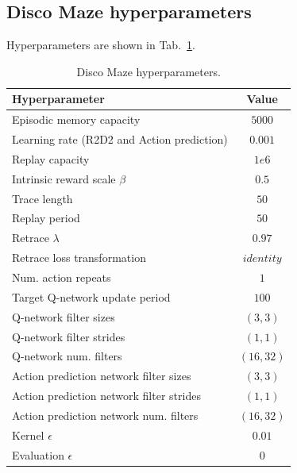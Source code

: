 \documentclass{article} %
\begin{document}
\subsection{Disco Maze hyperparameters}
Hyperparameters are shown in Tab.~\ref{table_hyper_discomaze}.
\begin{table}[h!]
\centering
\begin{tabular}{l|c}
\textbf{Hyperparameter} & \textbf{Value} \\ \hline
Episodic memory capacity & $5000$ \\ \hline
Learning rate (R2D2 and Action prediction) & $0.001$  \\ \hline
Replay capacity & $1e6$ \\ \hline 
Intrinsic reward scale $\beta$ & $0.5$ \\ \hline 
Trace length & $50$ \\ \hline
Replay period & $50$ \\ \hline
Retrace $\lambda$ & $0.97$ \\ \hline
Retrace loss transformation & $identity$ \\ \hline
Num. action repeats & $1$ \\ \hline
Target Q-network update period & $100$ \\ \hline
Q-network filter sizes & $(3, 3)$ \\ \hline
Q-network filter strides & $(1, 1)$ \\ \hline
Q-network num. filters & $(16, 32)$ \\ \hline
Action prediction network filter sizes & $(3, 3)$ \\ \hline
Action prediction network filter strides & $(1, 1)$ \\ \hline
Action prediction network num. filters & $(16, 32)$ \\ \hline
Kernel $\epsilon$ & $0.01$ \\ \hline
Evaluation $\epsilon$ & $0$ \\ \hline

\end{tabular}
\caption{Disco Maze hyperparameters.}
\label{table_hyper_discomaze}
\vspace{-2ex}
\end{table}
\end{document}
